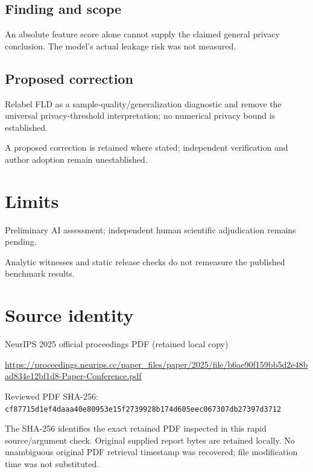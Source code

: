 \documentclass[11pt]{article}
\begin{document}
\subsection*{Finding and scope}

An absolute feature score alone cannot supply the claimed general privacy conclusion. The model’s actual leakage risk was not measured.

\subsection*{Proposed correction}

Relabel FLD as a sample-quality/generalization diagnostic and remove the universal privacy-threshold interpretation; no numerical privacy bound is established.

A proposed correction is retained where stated; independent verification and author adoption remain unestablished.

\section*{Limits}

Preliminary AI assessment; independent human scientific adjudication remains pending.\par

Analytic witnesses and static release checks do not remeasure the published benchmark results.\par

\section*{Source identity}

NeurIPS 2025 official proceedings PDF (retained local copy)

\url{https://proceedings.neurips.cc/paper_files/paper/2025/file/b6ae90f159bb5d2e48bad834e12bf1d8-Paper-Conference.pdf}

Reviewed PDF SHA-256: \nolinkurl{cf87715d1ef4daaa40e80953e15f2739928b174d605eec067307db27397d3712}

The SHA-256 identifies the exact retained PDF inspected in this rapid source/argument check. Original supplied report bytes are retained locally. No unambiguous original PDF retrieval timestamp was recovered; file modification time was not substituted.
\end{document}
